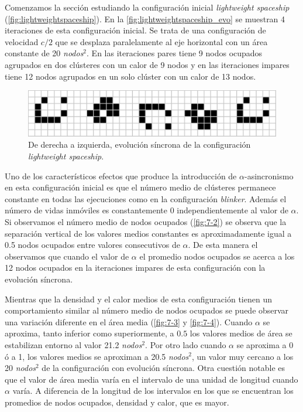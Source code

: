 \documentclass[../proyecto.tex]{memoir}
\begin{document}
Comenzamos la sección estudiando la configuración inicial \textit{lightweight spaceship} (\autoref{fig:lightweightspaceship}). En la \autoref{fig:lightweightspaceship_evo} se muestran 4 iteraciones de esta configuración inicial. Se trata de una configuración de velocidad $c/2$ que se desplaza paralelamente al eje horizontal con un área constante de 20 \textit{nodos}$^2$. En las iteraciones pares tiene 9 nodos ocupados agrupados en dos clústeres con un calor de 9 nodos y en las iteraciones impares tiene 12 nodos agrupados en un solo clúster con un calor de 13 nodos.

\begin{figure}[H]
	\centering
    \includegraphics[width=\textwidth]{./images/lightweightspaceship_evo.png}
    \caption{De derecha a izquierda, evolución síncrona de la configuración \textit{lightweight spaceship}.}
    \label{fig:lightweightspaceship_evo}
\end{figure}

Uno de los característicos efectos que produce la introducción de $\alpha$-asincronismo en esta configuración inicial es que el número medio de clústeres permanece constante en todas las ejecuciones como en la configuración \textit{blinker}. Además el número de vidas inmóviles es constantemente 0 independientemente al valor de $\alpha$. Si observamos el número medio de nodos ocupados (\autoref{fig:7-2}) se observa que la separación vertical de los valores medios constantes es aproximadamente igual a 0.5 nodos ocupados entre valores consecutivos de $\alpha$. De esta manera el observamos que cuando el valor de $\alpha$ el promedio nodos ocupados se acerca a los 12 nodos ocupados en la iteraciones impares de esta configuración con la evolución síncrona.

Mientras que la densidad y el calor medios de esta configuración tienen un comportamiento similar al número medio de nodos ocupados se puede observar una variación diferente en el área media (\autoref{fig:7-3} y \autoref{fig:7-4}). Cuando $\alpha$ se aproxima, tanto inferior como superiormente, a $0.5$ los valores medios de área se estabilizan entorno al valor 21.2 \textit{nodos}$^2$. Por otro lado cuando $\alpha$ se aproxima a 0 ó a 1, los valores medios se aproximan a 20.5 \textit{nodos}$^2$, un valor muy cercano a los 20 \textit{nodos}$^2$ de la configuración con evolución síncrona. Otra cuestión notable es que el valor de área media varía en el intervalo de una unidad de longitud cuando $\alpha$ varía. A diferencia de la longitud de los intervalos en los que se encuentran los promedios de nodos ocupados, densidad y calor, que es mayor.
\end{document}
